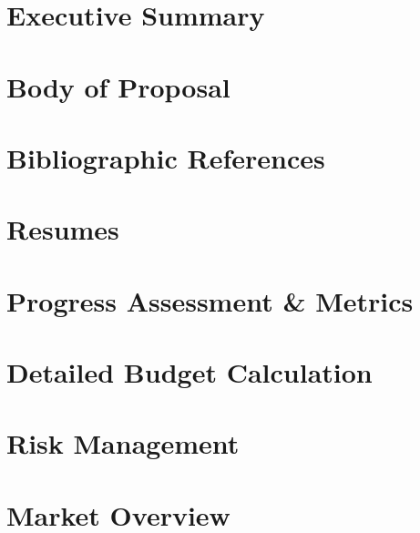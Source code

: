 \documentclass{article}
\begin{document}
 
 \section*{Executive Summary}
 \tableofcontents
 \section{Body of Proposal} 
 \section{Bibliographic References}
 \appendix
 \section{Resumes}
 \section{Progress Assessment \& Metrics}
 \section{Detailed Budget Calculation}
 \section{Risk Management}
 \section{Market Overview}
\end{document}
